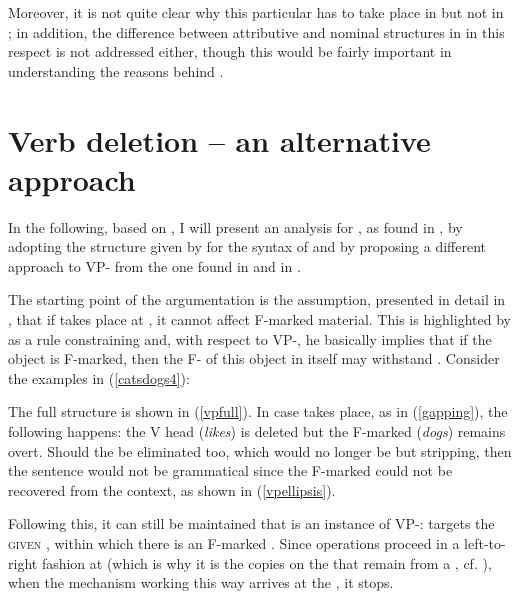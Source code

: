 Moreover, it is not quite clear why this particular  has to take place in  but not in ; in addition, the difference between attributive and nominal structures in  in this respect is not addressed either, though this would be fairly important in understanding the reasons behind .

\section{Verb deletion -- an alternative approach} \label{sec:4verbdeletion}
In the following, based on \citet{bacskaiatkari2012even}, I will present an analysis for , as found in , by adopting the structure given by \citet{kennedymerchant2000} for the syntax of  and by proposing a different approach to VP- from the one found in \citet{kennedymerchant2000} and in \citet{reglero2006}.

The starting point of the argumentation is the assumption, presented in detail in , that if  takes place at , it cannot affect F-marked material. This is highlighted by \citet[472--473]{reich2007} as a rule constraining   and, with respect to VP-, he basically implies that if the object is F-marked, then the F- of this object in itself may withstand . Consider the examples in (\ref{catsdogs4}):

\ea \label{catsdogs4}
 \label{vpfull}
 \label{gapping}
 \label{vpellipsis}
\z
\z

The full structure is shown in (\ref{vpfull}). In case  takes place, as in (\ref{gapping}), the following happens: the V head (\textit{likes}) is deleted but the F-marked  (\textit{dogs}) remains overt. Should the  be eliminated too, which would no longer be  but stripping, then the sentence would not be grammatical since the F-marked  could not be recovered from the context, as shown in (\ref{vpellipsis}).

Following this, it can still be maintained that   is an instance of VP-:  targets the \textsc{given} , within which there is an F-marked . Since  operations proceed in a left-to-right fashion at  (which is why it is the copies on the  that remain from a , cf. \citealt{boskovicnunes2007}), when the  mechanism working this way arrives at the , it stops.

